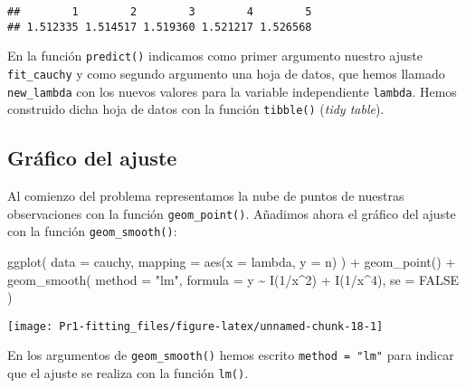 \documentclass[
  degree=mecinf,
  title=normal,
  toc=normal,
  bib=normal]{mnye}
\newenvironment{Shaded}{\begin{snugshade}}{\end{snugshade}}
\newcommand{\AttributeTok}[1]{\textcolor[rgb]{0.77,0.63,0.00}{#1}}
\newcommand{\ConstantTok}[1]{\textcolor[rgb]{0.00,0.00,0.00}{#1}}
\newcommand{\DecValTok}[1]{\textcolor[rgb]{0.00,0.00,0.81}{#1}}
\newcommand{\FunctionTok}[1]{\textcolor[rgb]{0.00,0.00,0.00}{#1}}
\newcommand{\NormalTok}[1]{#1}
\newcommand{\SpecialCharTok}[1]{\textcolor[rgb]{0.00,0.00,0.00}{#1}}
\newcommand{\StringTok}[1]{\textcolor[rgb]{0.31,0.60,0.02}{#1}}
\begin{document}
\begin{verbatim}
##        1        2        3        4        5 
## 1.512335 1.514517 1.519360 1.521217 1.526568
\end{verbatim}

En la función \texttt{predict()} indicamos como primer argumento nuestro ajuste \texttt{fit\_cauchy} y como segundo argumento una hoja de datos, que hemos llamado \texttt{new\_lambda} con los nuevos valores para la variable independiente \texttt{lambda}. Hemos construido dicha hoja de datos con la función \texttt{tibble()} (\emph{tidy table}).

\hypertarget{gruxe1fico-del-ajuste}{%
\subsection{Gráfico del ajuste}\label{gruxe1fico-del-ajuste}}

Al comienzo del problema representamos la nube de puntos de nuestras observaciones con la función \texttt{geom\_point()}. Añadimos ahora el gráfico del ajuste con la función \texttt{geom\_smooth()}:

\begin{Shaded}
\begin{Highlighting}[]
\FunctionTok{ggplot}\NormalTok{(}
    \AttributeTok{data =}\NormalTok{ cauchy, }
    \AttributeTok{mapping =} \FunctionTok{aes}\NormalTok{(}\AttributeTok{x =}\NormalTok{ lambda, }\AttributeTok{y =}\NormalTok{ n)}
\NormalTok{) }\SpecialCharTok{+} 
    \FunctionTok{geom\_point}\NormalTok{() }\SpecialCharTok{+} 
    \FunctionTok{geom\_smooth}\NormalTok{(}
        \AttributeTok{method =} \StringTok{"lm"}\NormalTok{,}
        \AttributeTok{formula =}\NormalTok{ y }\SpecialCharTok{\textasciitilde{}} \FunctionTok{I}\NormalTok{(}\DecValTok{1}\SpecialCharTok{/}\NormalTok{x}\SpecialCharTok{\^{}}\DecValTok{2}\NormalTok{) }\SpecialCharTok{+} \FunctionTok{I}\NormalTok{(}\DecValTok{1}\SpecialCharTok{/}\NormalTok{x}\SpecialCharTok{\^{}}\DecValTok{4}\NormalTok{),}
        \AttributeTok{se =} \ConstantTok{FALSE}
\NormalTok{    ) }
\end{Highlighting}
\end{Shaded}

\begin{center}\texttt{[image: Pr1-fitting\_files/figure-latex/unnamed-chunk-18-1]} \end{center}

En los argumentos de \texttt{geom\_smooth()} hemos escrito \texttt{method\ =\ "lm"} para indicar que el ajuste se realiza con la función \texttt{lm()}.
\end{document}
